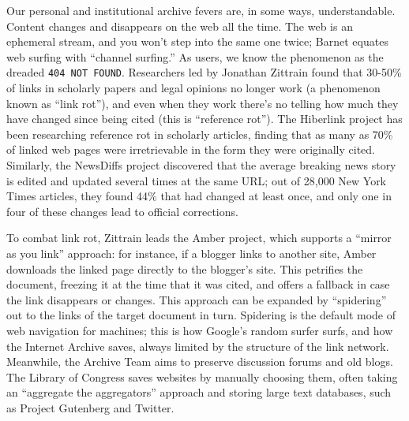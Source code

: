 Our personal and institutional archive fevers are, in some ways, understandable. Content changes and disappears on the web all the time. The web is an ephemeral stream, and you won't step into the same one twice; Barnet equates web surfing with ``channel surfing.''\autocite[217]{barnet_pack-rat_2001} As users, we know the phenomenon as the dreaded \texttt{404 NOT FOUND}. Researchers led by Jonathan Zittrain found that 30-50\% of links in scholarly papers and legal opinions no longer work (a phenomenon known as ``link rot''), and even when they work there's no telling how much they have changed since being cited (this is ``reference rot'').\autocite{zittrain_perma:_2013} The Hiberlink project has been researching reference rot in scholarly articles, finding that as many as 70\% of linked web pages were irretrievable in the form they were originally cited.\autocite{_one_2015} Similarly, the NewsDiffs project discovered that the average breaking news story is edited and updated several times at the same URL; out of 28,000 New York Times articles, they found 44\% that had changed at least once, and only one in four of these changes lead to official corrections.\autocite{lee_version_2013}

To combat link rot, Zittrain leads the Amber project, which supports a ``mirror as you link'' approach: for instance, if a blogger links to another site, Amber downloads the linked page directly to the blogger's site.\autocite[See http://amberlink.org; see also][]{zittrain_fourth_2010} This petrifies the document, freezing it at the time that it was cited, and offers a fallback in case the link disappears or changes. This approach can be expanded by ``spidering'' out to the links of the target document in turn. Spidering is the default mode of web navigation for machines; this is how Google's random surfer surfs, and how the Internet Archive saves, always limited by the structure of the link network. Meanwhile, the Archive Team aims to preserve discussion forums and old blogs. The Library of Congress saves websites by manually choosing them, often taking an ``aggregate the aggregators'' approach and storing large text databases, such as Project Gutenberg and Twitter.


